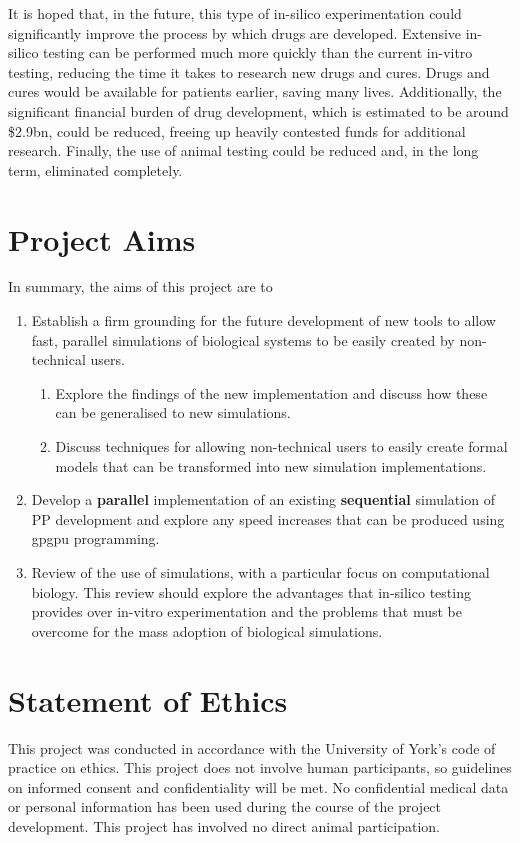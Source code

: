\documentclass{UoYCSproject}
\begin{document}
It is hoped that, in the future, this type of \gls{in-silico} experimentation could significantly improve the process by which drugs are developed.
Extensive \gls{in-silico} testing can be performed much more quickly than the current \gls{in-vitro} testing, reducing the time it takes to research new drugs and cures.
Drugs and cures would be available for patients earlier, saving many lives.
Additionally, the significant financial burden of drug development, which is estimated to be around \$2.9bn\cite{drug_cost}, could be reduced, freeing up heavily contested funds for additional research.
Finally, the use of animal testing could be reduced and, in the long term, eliminated completely.

\section{Project Aims}
In summary, the aims of this project are to
\begin{enumerate}
    \item Establish a firm grounding for the future development of new tools to allow fast, parallel simulations of biological systems to be easily created by non-technical users.
    \begin{enumerate}
        \item Explore the findings of the new implementation and discuss how these can be generalised to new simulations.
        \item Discuss techniques for allowing non-technical users to easily create formal models that can be transformed into new simulation implementations.
    \end{enumerate}
    \item Develop a \textbf{parallel} implementation of an existing \textbf{sequential} simulation of \gls{PP} development and explore any speed increases that can be produced using \gls{gpgpu} programming.
    \item Review of the use of simulations, with a particular focus on computational biology. This review should explore the advantages that in-silico testing provides over \gls{in-vitro} experimentation and the problems that must be overcome for the mass adoption of biological simulations.
    
\end{enumerate}

\section{Statement of Ethics}
This project was conducted in accordance with the University of York's code of practice on ethics.
This project does not involve human participants, so guidelines on informed consent and confidentiality will be met. No confidential medical data or personal information has been used during the course of the project development. This project has involved no direct animal participation.
\end{document}
